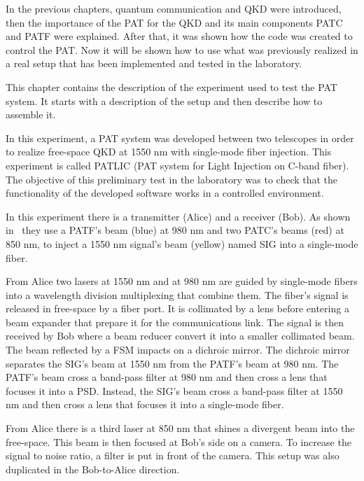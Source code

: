 In the previous chapters, quantum communication and QKD were introduced, then the importance of the PAT for the QKD and its main components PATC and PATF were explained.
After that, it was shown how the code was created to control the PAT. Now it will be shown how to use what was previously realized in a real setup that has been implemented and tested in the laboratory.

This chapter contains the description of the experiment used to test the PAT system. It starts with a description of the setup and then describe how to assemble it.


In this experiment, a PAT system was developed between two telescopes in order to realize free-space QKD at 1550 nm with single-mode fiber injection. This experiment is called PATLIC (PAT system for Light Injection on C-band fiber).
The objective of this preliminary test in the laboratory was to check that the functionality of the developed software works in a controlled environment.

In this experiment there is a transmitter (Alice) and a receiver (Bob). As shown in~ they use a PATF's beam (blue) at 980 nm and two PATC's beams (red) at 850 nm, to inject a 1550 nm signal's beam (yellow) named SIG into a single-mode fiber.

From Alice two lasers at 1550 nm and at 980 nm are guided by single-mode fibers into a wavelength division multiplexing that combine them. The fiber's signal is released in free-space by a fiber port. It is collimated by a lens before entering a beam expander that prepare it for the communications link. The signal is then received by Bob where a beam reducer convert it into a smaller collimated beam. The beam reflected by a FSM impacts on a dichroic mirror. The dichroic mirror separates the SIG's beam at 1550 nm from the PATF's beam at 980 nm. The PATF's beam cross a band-pass filter at 980 nm and then cross a lens that focuses it into a PSD. Instead, the SIG's beam cross a band-pass filter at 1550 nm and then cross a lens that focuses it into a single-mode fiber.

From Alice there is a third laser at 850 nm that shines a divergent beam into the free-space. This beam is then focused at Bob's side on a camera. To increase the signal to noise ratio, a filter is put in front of the camera. This setup was also duplicated in the Bob-to-Alice direction.

